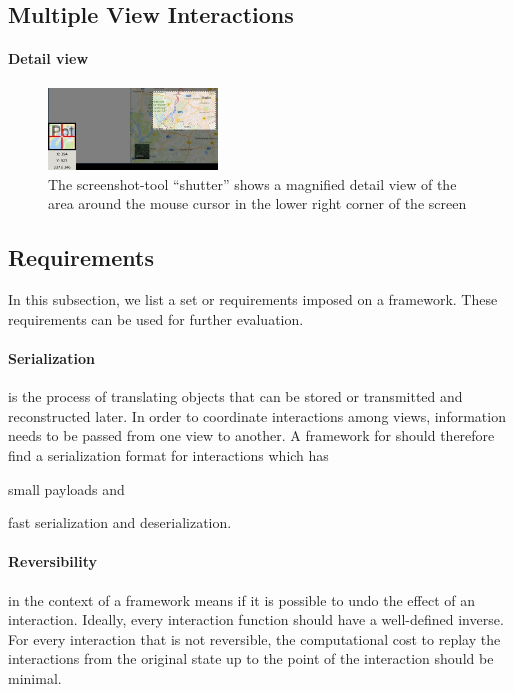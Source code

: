 \subsection{Multiple View Interactions}\label{sec:analysis:examples}

\paragraph{Detail view}
\begin{figure}
  \centering
  \includegraphics[width=0.4\textwidth]{images/chartTypes/multi/detail-view}
  \caption{The screenshot-tool ``shutter'' shows a magnified detail view of the area around the mouse cursor in the lower right corner of the screen}\label{fig:concept:chart-types:detail}
\end{figure}

\subsection{Requirements}
In this subsection, we list a set or requirements imposed on a \cmv{} framework.
These requirements can be used for further evaluation.
\paragraph{Serialization} is the process of translating objects that can be stored or transmitted and reconstructed later.
In order to coordinate interactions among views, information needs to be passed from one view to another. 
A framework for \cmvs{} should therefore find a serialization format for interactions which has
\begin{enumerate*}[label=(\arabic*)]
  \item
    small payloads and
  \item 
    fast serialization and deserialization.
\end{enumerate*}

\paragraph{Reversibility} in the context of a \cmv{} framework means if it is possible to undo the effect of an interaction.
Ideally, every interaction function should have a well-defined inverse.
For every interaction that is not reversible, the computational cost to replay the interactions from the original state up to the point of the interaction should be minimal.

